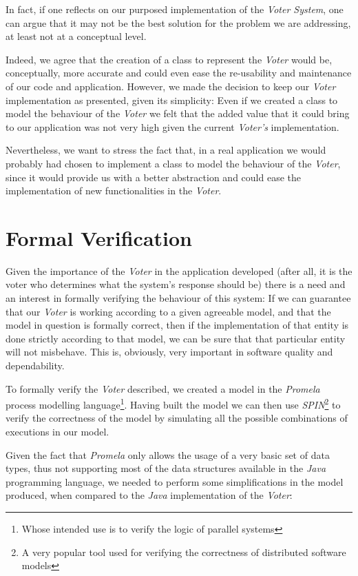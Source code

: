 In fact, if one reflects on our purposed implementation of the \emph{Voter System}, one can argue that it may not be the best solution for the problem we are addressing, at least not at a conceptual level.

Indeed, we agree that the creation of a class to represent the \emph{Voter} would be, conceptually, more accurate and could even ease the re-usability and maintenance of our code and application. However, we made the decision to keep our \emph{Voter} implementation as presented, given its simplicity: Even if we created a class to model the behaviour of the \emph{Voter} we felt that the added value that it could bring to our application was not very high given the current \emph{Voter's} implementation.

Nevertheless, we want to stress the fact that, in a real application we would probably had chosen to implement a class to model the behaviour of the \emph{Voter}, since it would provide us with a better abstraction and could ease the implementation of new functionalities in the \emph{Voter}.

\section{Formal Verification}

Given the importance of the \emph{Voter} in the application developed (after all, it is the voter who determines what the system's response should be) there is a need and an interest in formally verifying the behaviour of this system: If we can guarantee that our \emph{Voter} is working according to a given agreeable model, and that the model in question is formally correct, then if the implementation of that entity is done strictly according to that model, we can be sure that that particular entity will not misbehave. This is, obviously, very important in software  quality and dependability.

To formally verify the \emph{Voter} described, we created a model in the \emph{Promela} process modelling language\footnote{Whose intended use is to verify the logic of parallel systems}. Having built the model we can then use \emph{SPIN}\footnote{A very popular tool used for verifying the correctness of distributed software models} to verify the correctness of the model by simulating all the possible combinations of executions in our model.

Given the fact that \emph{Promela} only allows the usage of a very basic set of data types, thus not supporting most of the data structures available in the \emph{Java} programming language, we needed to perform some simplifications in the model produced, when compared to the \emph{Java} implementation of the \emph{Voter}:

